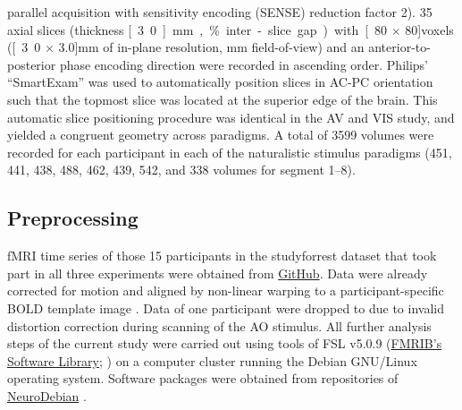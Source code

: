 \documentclass[english]{article}
\begin{document}
parallel acquisition with sensitivity encoding (SENSE) reduction factor 2).
35 axial slices (thickness \unit[3.0]{mm}, \unit[10]{\%} inter-slice gap) with
\unit[80 $\times$ 80]{voxels} (\unit[3.0 $\times$ 3.0]{mm} of in-plane
resolution, \unit[240]{mm} field-of-view) and an anterior-to-posterior phase
encoding direction were recorded in ascending order.
Philips' ``SmartExam'' was used to automatically position slices in AC-PC
orientation such that the topmost slice was located at the superior edge of the
brain. This automatic slice positioning procedure was identical in the AV and
VIS study, and yielded a congruent geometry across paradigms.
A total of 3599 volumes were recorded for each participant in each of the
naturalistic stimulus paradigms (451, 441, 438, 488, 462, 439, 542, and 338
volumes for segment 1–8).


\subsection{Preprocessing}



fMRI time series of those 15 participants in the studyforrest dataset that took
part in all three experiments were obtained from
\href{https://github.com/psychoinformatics-de/studyforrest-data-aligned}{GitHub}.
Data were already corrected for motion and aligned by non-linear warping to a
participant-specific BOLD template image \citep{sengupta2016extension}.
Data of one participant were dropped to due to invalid distortion correction
during scanning of the AO stimulus.
All further analysis steps of the current study were carried out using tools of
FSL v5.0.9 (\href{https://www.fmrib.ox.ac.uk/fsl}{FMRIB's Software Library};
\citep{smith2004fsl}) on a computer cluster running the Debian GNU/Linux
operating system. Software packages were obtained from repositories of
\href{http://neuro.debian.net}{NeuroDebian} \citep{halchenko2012open}.
\end{document}
